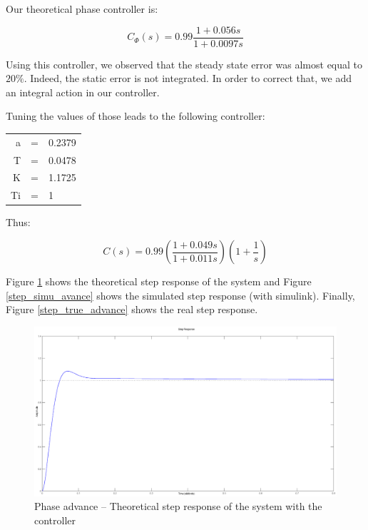 Our theoretical phase controller is:

$$C_{\Phi}(s) = 0.99 \frac{1 + 0.056s}{1 + 0.0097s} $$

Using this controller, we observed that the steady state error was almost equal to $20\%$. Indeed, the static error is not integrated. In order to correct that, we add an integral action in our controller.

Tuning the values of those leads to the following controller:

\begin{center}
 \begin{tabular}{rcl}
 a & = &0.2379 \\
 T & = &  0.0478 \\
K & = & 1.1725 \\
Ti & = & 1 \\
\end{tabular}
\end{center}

Thus:

$$C(s) = 0.99 \left(\frac{1 + 0.049s}{1+0.011s}\right)\left(1+\frac{1}{s}\right)$$


Figure \ref{step_avance} shows the theoretical step response of the system and Figure \ref{step_simu_avance} shows the simulated step response (with simulink). Finally, Figure \ref{step_true_advance} shows the real step response.

\begin{center}
 \begin{figure}[ht]
 \includegraphics[width=\linewidth]{fig/step_avance.eps}
 \caption{Phase advance -- Theoretical step response of the system with the controller}
 \label{step_avance}
 \end{figure}
\end{center}

